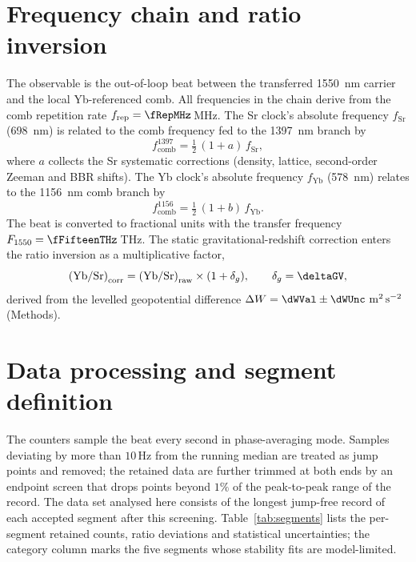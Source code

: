 \section{Frequency chain and ratio inversion}
\label{app:chain}

The observable is the out-of-loop beat between the transferred
\qty{1550}{nm} carrier and the local Yb-referenced comb. All
frequencies in the chain derive from the comb repetition rate
$f_{\mathrm{rep}} = \fRepMHz$\,MHz. The Sr clock's absolute frequency
$f_{\mathrm{Sr}}$ (\qty{698}{nm}) is related to the comb frequency fed
to the \qty{1397}{nm} branch by
\begin{equation}
  f_{\mathrm{comb}}^{1397} = \tfrac{1}{2}\,(1 + a)\,f_{\mathrm{Sr}},
\end{equation}
where $a$ collects the Sr systematic corrections (density, lattice,
second-order Zeeman and BBR shifts). The Yb clock's absolute frequency
$f_{\mathrm{Yb}}$ (\qty{578}{nm}) relates to the \qty{1156}{nm} comb
branch by
\begin{equation}
  f_{\mathrm{comb}}^{1156} = \tfrac{1}{2}\,(1 + b)\,f_{\mathrm{Yb}}.
\end{equation}
The beat is converted to fractional units with the transfer frequency
$F_{1550} = \fFifteenTHz$\,THz. The static gravitational-redshift
correction enters the ratio inversion as a multiplicative factor,
\begin{equation}
  \left(\mathrm{Yb/Sr}\right)_{\rm corr}
  = \left(\mathrm{Yb/Sr}\right)_{\rm raw} \times (1 + \delta_g),
  \qquad \delta_g = \deltaGV,
\end{equation}
derived from the levelled geopotential difference
$\dW = \dWVal \pm \dWUnc~\mathrm{m^2\,s^{-2}}$ (Methods).

\section{Data processing and segment definition}
\label{app:processing}

The counters sample the beat every second in phase-averaging mode.
Samples deviating by more than $10$\,Hz from the running median are
treated as jump points and removed; the retained data are further
trimmed at both ends by an endpoint screen that drops points beyond
$1\%$ of the peak-to-peak range of the record. The data set analysed
here consists of the longest jump-free record of each accepted segment
after this screening. Table~\ref{tab:segments} lists the per-segment
retained counts, ratio deviations and statistical uncertainties; the
category column marks the five segments whose stability fits are
model-limited.

